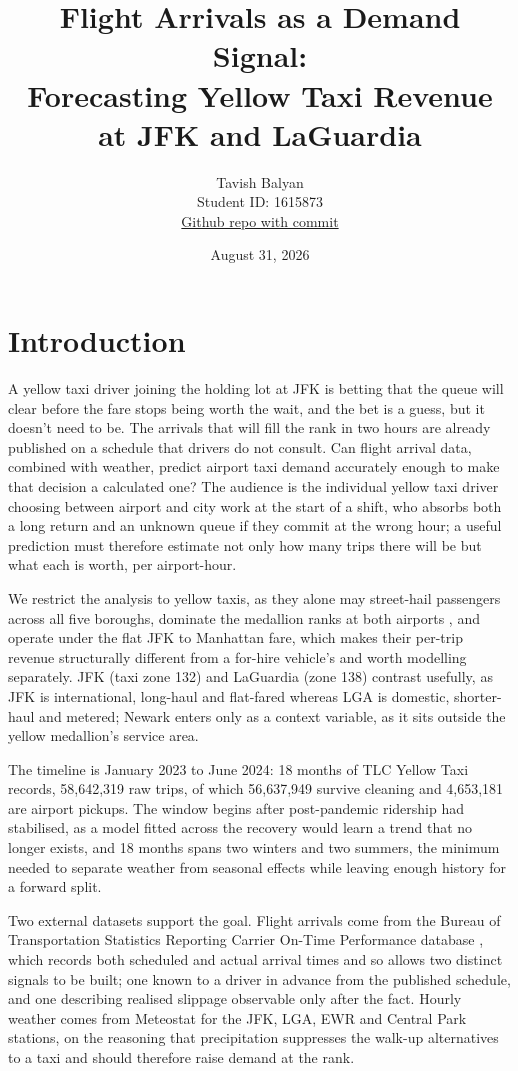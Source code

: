 \documentclass[11pt]{article}
\title{Flight Arrivals as a Demand Signal:\\
Forecasting Yellow Taxi Revenue at JFK and LaGuardia}
\author{Tavish Balyan \\ Student ID: 1615873 \\
\href{https://github.com/MAST30034-AppliedDataScience/project-1-individual-SavvyHack}{Github repo with commit}}
\date{August 31, 2026}
\begin{document}
\maketitle
 
\section{Introduction}
 
A yellow taxi driver joining the holding lot at JFK is betting that the queue
will clear before the fare stops being worth the wait, and the bet is a guess, but it doesn't need to be.
The arrivals that will fill the rank in two hours are already published on a
schedule that drivers do not consult. Can flight arrival data, combined with
weather, predict airport taxi demand accurately enough to make that decision a
calculated one? The audience is the individual yellow taxi driver choosing
between airport and city work at the start of a shift, who absorbs both a long
return and an unknown queue if they commit at the wrong hour; a useful prediction
must therefore estimate not only how many trips there will be but what each is
worth, per airport-hour.
 
We restrict the analysis to yellow taxis, as they alone may street-hail
passengers across all five boroughs, dominate the medallion ranks at both
airports \cite{tlc_userguide}, and operate under the flat JFK to Manhattan fare,
which makes their per-trip revenue structurally different from a for-hire
vehicle's and worth modelling separately. JFK (taxi zone 132) and LaGuardia
(zone 138) contrast usefully, as JFK is international, long-haul and flat-fared
whereas LGA is domestic, shorter-haul and metered; Newark enters only as a
context variable, as it sits outside the yellow medallion's service area.
 
The timeline is January 2023 to June 2024: 18 months of TLC Yellow Taxi records,
58,642,319 raw trips, of which 56,637,949 survive cleaning and 4,653,181 are
airport pickups. The window begins after post-pandemic ridership had stabilised,
as a model fitted across the recovery would learn a trend that no longer exists,
and 18 months spans two winters and two summers, the minimum needed to separate
weather from seasonal effects while leaving enough history for a forward split.
 
Two external datasets support the goal. Flight arrivals come from the Bureau of
Transportation Statistics Reporting Carrier On-Time Performance database
\cite{bts}, which records both scheduled and actual arrival times and so allows
two distinct signals to be built; one known to a driver in advance from the
published schedule, and one describing realised slippage observable only after
the fact. Hourly weather comes from Meteostat \cite{meteostat} for the JFK, LGA,
EWR and Central Park stations, on the reasoning that precipitation suppresses the
walk-up alternatives to a taxi and should therefore raise demand at the rank.
 
\end{document}

